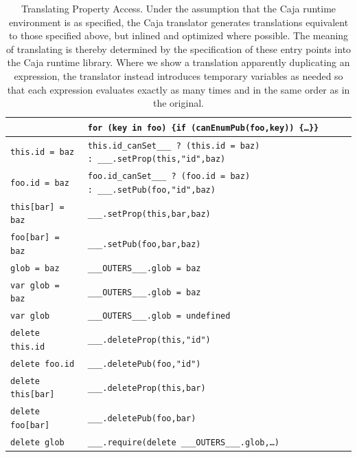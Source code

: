 \documentclass[letterpaper,twocolumn,10pt]{article}
\newcommand{\code}[1]{{\tt {#1}}}              %
\begin{document}
\begin{table}
\begin{tabular}{ll}
    & \code{for (key in foo)\ \{if (canEnumPub(foo,key))\ \{\ldots\}\}} \\
  \hline
  \code{this.id = baz}    
    & \code{this.id\_canSet\_\_\_ ?\ (this.id = baz) :\
\_\_\_.setProp(this,"id",baz)} \\
  \code{foo.id = baz}     
    & \code{foo.id\_canSet\_\_\_ ?\ (foo.id = baz) :\
\_\_\_.setPub(foo,"id",baz)} \\
  \code{this[bar] = baz}  & \code{\_\_\_.setProp(this,bar,baz)} \\
  \code{foo[bar] = baz}   & \code{\_\_\_.setPub(foo,bar,baz)} \\
  \code{glob = baz}       & \code{\_\_\_OUTERS\_\_\_.glob = baz} \\
  \code{var glob = baz}   & \code{\_\_\_OUTERS\_\_\_.glob = baz} \\
  \code{var glob}         & \code{\_\_\_OUTERS\_\_\_.glob = undefined} \\
  \hline               
  \code{delete this.id}   & \code{\_\_\_.deleteProp(this,"id")} \\
  \code{delete foo.id}    & \code{\_\_\_.deletePub(foo,"id")} \\
  \code{delete this[bar]} & \code{\_\_\_.deleteProp(this,bar)} \\
  \code{delete foo[bar]}  & \code{\_\_\_.deletePub(foo,bar)} \\
  \code{delete glob}      
         & \code{\_\_\_.require(delete \_\_\_OUTERS\_\_\_.glob,\ldots)} \\
\end{tabular}

\caption[Translating Property Access]{Translating Property Access. Under the 
assumption that the Caja runtime environment is as specified, the Caja 
translator generates translations equivalent to those specified above, but 
inlined and optimized where possible. The meaning of translating is thereby 
determined by the specification of these entry points into the Caja runtime 
library. Where we show a translation apparently duplicating an expression,
the translator instead introduces temporary variables as needed so that
each expression evaluates exactly as many times and in the same order as in
the original.}
\label{tab:prop-xlate}
\end{table}
\end{document}
